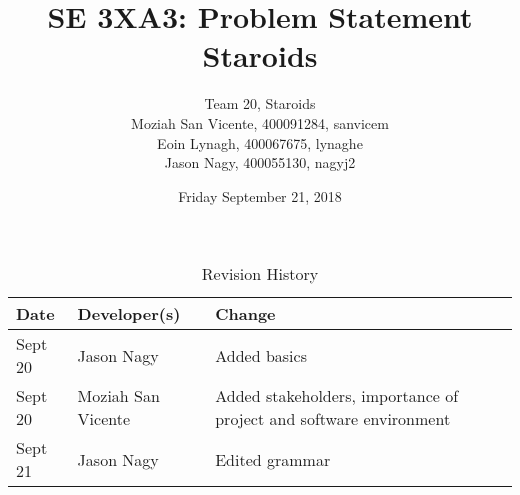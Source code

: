 \documentclass{article}
\title{SE 3XA3: Problem Statement\\Staroids}
\author{Team 20, Staroids
		\\ Moziah San Vicente, 400091284, sanvicem
		\\ Eoin Lynagh, 400067675, lynaghe
		\\ Jason Nagy, 400055130, nagyj2
}
\date{Friday September 21, 2018}
\begin{document}
\begin{table}[hp]
\caption{Revision History} \label{TblRevisionHistory}
\begin{tabularx}{\textwidth}{llX}
\toprule
\textbf{Date} & \textbf{Developer(s)} & \textbf{Change}\\
\midrule
Sept 20 & Jason Nagy & Added basics\\
Sept 20 & Moziah San Vicente & Added stakeholders, importance of project and software environment\\
Sept 21 & Jason Nagy & Edited grammar\\
\bottomrule
\end{tabularx}
\end{table}

\newpage

\maketitle
\end{document}
